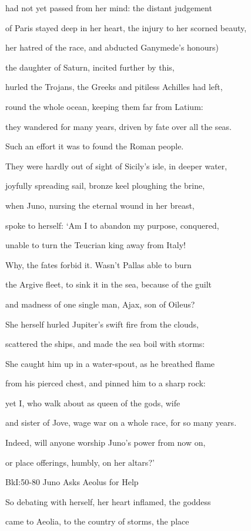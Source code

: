 \documentclass[12pt, a5paper]{minimal}
\begin{document}
had not yet passed from her mind: the distant judgement

of Paris stayed deep in her heart, the injury to her scorned beauty,

her hatred of the race, and abducted Ganymede’s honours)

the daughter of Saturn, incited further by this,

hurled the Trojans, the Greeks and pitiless Achilles had left,

round the whole ocean, keeping them far from Latium:

they wandered for many years, driven by fate over all the seas.

Such an effort it was to found the Roman people.

They were hardly out of sight of Sicily’s isle, in deeper water,

joyfully spreading sail, bronze keel ploughing the brine,

when Juno, nursing the eternal wound in her breast,

spoke to herself: ‘Am I to abandon my purpose, conquered,

unable to turn the Teucrian king away from Italy!

Why, the fates forbid it. Wasn’t Pallas able to burn

the Argive fleet, to sink it in the sea, because of the guilt

and madness of one single man, Ajax, son of Oileus?

She herself hurled Jupiter’s swift fire from the clouds,

scattered the ships, and made the sea boil with storms:

She caught him up in a water-spout, as he breathed flame

from his pierced chest, and pinned him to a sharp rock:

yet I, who walk about as queen of the gods, wife

and sister of Jove, wage war on a whole race, for so many years.

Indeed, will anyone worship Juno’s power from now on,

or place offerings, humbly, on her altars?’

BkI:50-80 Juno Asks Aeolus for Help

So debating with herself, her heart inflamed, the goddess

came to Aeolia, to the country of storms, the place
\end{document}
